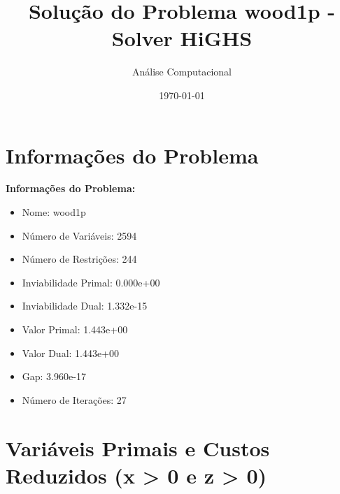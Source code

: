 \documentclass[12pt]{article}
\title{Solução do Problema wood1p - Solver HiGHS}
\author{Análise Computacional}
\date{\today}
\begin{document}
\maketitle

\section{Informações do Problema}

\textbf{Informações do Problema:}
\begin{itemize}
\item Nome: wood1p
\item Número de Variáveis: 2594
\item Número de Restrições: 244
\item Inviabilidade Primal: 0.000e+00
\item Inviabilidade Dual: 1.332e-15
\item Valor Primal: 1.443e+00
\item Valor Dual: 1.443e+00
\item Gap: 3.960e-17
\item Número de Iterações: 27
\end{itemize}


\section{Variáveis Primais e Custos Reduzidos (x > 0 e z > 0)}
\end{document}
